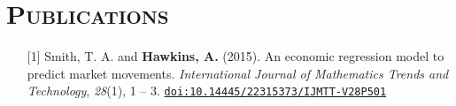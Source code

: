 \documentclass[10pt]{article}
\begin{document}
\section*{\textsc{Publications}}
\begin{itemize}[leftmargin=*]
    \item[] [1] Smith, T. A. and \textbf{Hawkins, A.} (2015). An economic regression model to predict market movements. \textit{International Journal of Mathematics Trends and Technology}, \textit{28}(1), 1 -- 3. \texttt{\href{http://dx.doi.org/10.14445/22315373/IJMTT-V28P501}{doi:10.14445/22315373/IJMTT-V28P501}}
\end{itemize}
\end{document}
